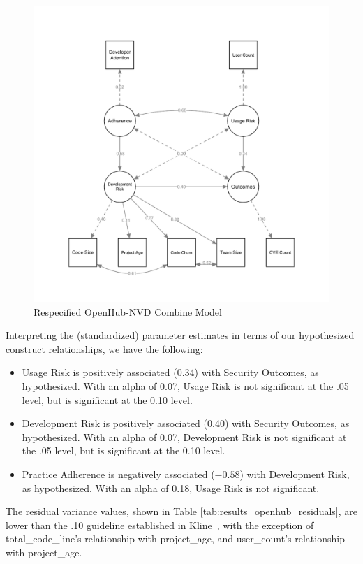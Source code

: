 \begin{figure}
	\centering
	\includegraphics[width=1\textwidth]{Openhub_Respecified_SEM_Model.pdf}
	\caption{Respecified OpenHub-NVD Combine Model}
	\label{fig:openhub_model_respecified_estimates}
\end{figure}

Interpreting the (standardized) parameter estimates in terms of our hypothesized construct relationships, we have the following:
\begin{itemize}
	\item  Usage Risk is positively associated (0.34) with Security Outcomes, as hypothesized. With an alpha of 0.07, Usage Risk is not significant at the .05 level, but is significant at the 0.10 level.
	\item Development Risk is positively associated (0.40) with Security Outcomes, as hypothesized. With an alpha of 0.07, Development Risk is not significant at the .05 level, but is significant at the 0.10 level.
	\item Practice Adherence is negatively associated ($-0.58$) with Development Risk, as hypothesized. With an alpha of 0.18, Usage Risk is not significant.
\end{itemize}	 

The residual variance values, shown in Table \ref{tab:results_openhub_residuals}, are lower than the .10 guideline established in Kline~\cite{kline2015principles}, with the exception of total\_code\_line's relationship with project\_age, and user\_count's relationship with project\_age. 

